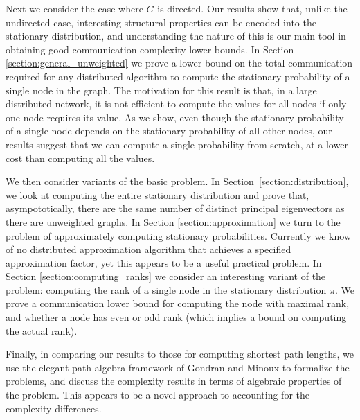 \documentclass[twocolumn]{article}
\begin{document}
Next we consider the case where $G$ is directed. Our results show that,
unlike the undirected case, interesting structural properties can be encoded into the stationary distribution, and
understanding the nature of this is our main tool in obtaining
good communication complexity lower bounds. In Section
\ref{section:general_unweighted} we prove a lower bound on the total
communication required for any distributed algorithm to compute the
stationary probability of a single node in the graph. The motivation for this result is that, in a large distributed network, it is not efficient to compute the values for all nodes if only one node requires its value. As we show, even though the stationary probability of a single node depends on the stationary probability of all other nodes, our results suggest that we can compute a single probability from scratch, at a lower cost than computing all the values.

We then consider variants of the basic problem. In
Section~\ref{section:distribution}, we look at computing
the entire stationary distribution and prove that, asympototically, there are the same number of distinct principal eigenvectors as there are unweighted graphs. In Section \ref{section:approximation} we turn to the problem of
approximately computing stationary probabilities. Currently we know of
no distributed approximation algorithm that achieves a specified
approximation factor, yet this appears to be a useful practical problem.
In Section \ref{section:computing_ranks} we consider an interesting
variant of the problem: computing the rank of a single node in the
stationary distribution $\pi$. We prove a communication lower bound for
computing the node with maximal rank, and whether a node has even or odd
rank (which implies a bound on computing the actual rank).

Finally, in comparing our results to those for computing shortest path lengths, we use the elegant path algebra framework of Gondran and Minoux \cite{817} to formalize the problems, and discuss the complexity results in terms of algebraic properties of the problem. This appears to be a novel approach to accounting for the complexity differences.
\end{document}
